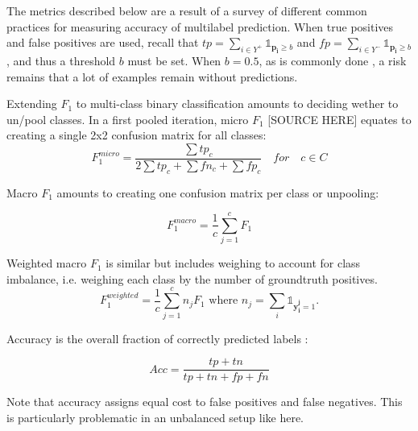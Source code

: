 
The metrics described below are a result of a survey of different common practices for measuring accuracy of multilabel prediction. When true positives and false positives are used, recall that \(t p=\sum_{i \in Y^{+}} \mathds{1}_{\mathbf{p_i} \geq b}\) and \(f p=\sum_{i \in Y^{-}} \mathds{1}_{\mathbf{p_i} \geq b}\), and thus a threshold \(b\) must be set. When \(b = 0.5\), as is commonly done , a risk remains that a lot of examples remain without predictions.

Extending \(F_1\) to multi-class binary classification amounts to deciding wether to un/pool classes.
In a first pooled iteration, micro \(F_1\) [SOURCE HERE] equates to creating a single 2x2 confusion matrix for all classes:
$$F_1^{micro} = \frac{\sum tp_c}{2 \sum tp_c + \sum fn_c + \sum fp_c} \quad for \quad c \in C$$

Macro \(F_1\) \cite{threshForF1} amounts to creating one confusion matrix per class or unpooling:

$$F_1^{macro} = \frac{1}{c} \sum_{j=1}^c F_1$$


Weighted macro \(F_1\)  is similar but includes weighing to account for class imbalance, i.e. weighing each class by the number of groundtruth positives.
\begin{equation}
F_1^{weighted} = \frac{1}{c} \sum_{j=1}^c n_j F_1 \text{ where } n_j = \sum_i \mathds{1}_{\mathbf{y_i^j} = 1}.
\end{equation}


Accuracy is the overall fraction of correctly predicted labels \cite{threshForF1}:

$$
A c c=\frac{\mathit{tp} + \mathit{tn}}{\mathit{tp} + \mathit{tn} + \mathit{fp} + \mathit{fn}}
$$

Note that accuracy assigns equal cost to false positives and false negatives. This is particularly problematic in an unbalanced setup like here.


